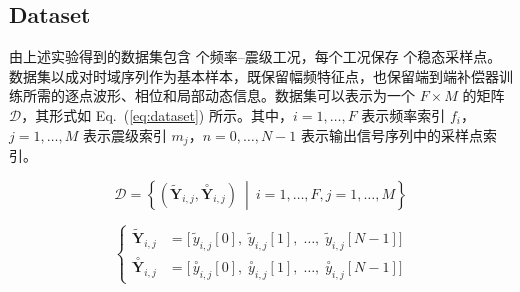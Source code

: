 \documentclass[sn-nature]{sn-jnl}
\newif\ifCNENEnglish
\newif\ifCNENBilingual
\newcommand{\CNEN}[2]{%
    \ifCNENBilingual
        #1%
        \if\relax\detokenize{#2}\relax\else\par #2\fi%
    \else
        \ifCNENEnglish
            #2%
        \else
            #1%
        \fi
    \fi
}
\newcommand{\magn}{m} %
\newcommand{\fidx}{i} %
\newcommand{\fmax}{F} %
\newcommand{\midx}{j} %
\newcommand{\mmax}{M} %
\newcommand{\pidx}{n} %
\newcommand{\pmax}{N} %
\newcommand{\dataset}{{\mathcal{D}}} %
\newcommand{\yseq}{{\mathbf{Y}}} %
\newcommand{\ideal}[1]{\overset{\circ}{#1}} %
\newcommand{\exam}[1]{\tilde{#1}} %
\begin{document}
\subsection{Dataset}
\CNEN{由上述实验得到的数据集包含 \valDatasetOperatingPoints{} 个频率--震级工况，每个工况保存 \valDatasetPointsPerRecord{} 个稳态采样点。数据集以成对时域序列作为基本样本，既保留幅频特征点，也保留端到端补偿器训练所需的逐点波形、相位和局部动态信息。数据集可以表示为一个 $\fmax \times \mmax$ 的矩阵 $\dataset$，其形式如 Eq.~(\ref{eq:dataset}) 所示。其中，$\fidx = 1,\dots,\fmax$ 表示频率索引 $f_\fidx$，$\midx = 1,\dots,\mmax$ 表示震级索引 $\magn_\midx$，$\pidx = 0,\dots,\pmax-1$ 表示输出信号序列中的采样点索引。}{}
\begin{equation}
    \dataset = \left\{ \left(\exam{\yseq}_{\fidx,\midx}, \ideal{\yseq}_{\fidx,\midx} \right) \ \middle| \ \fidx = 1, \dots, \fmax, \midx = 1, \dots, \mmax \right\}
    \label{eq:dataset}
\end{equation}

\begin{equation}
    \left\{
    \begin{aligned}
        \exam{\yseq}_{\fidx,\midx}  & =
        \bigl[
            \,\exam{y}_{\fidx,\midx}[0],\;
            \exam{y}_{\fidx,\midx}[1],\;
            \ldots,\;
            \exam{y}_{\fidx,\midx}[\pmax-1]
        \bigr]                          \\
        \ideal{\yseq}_{\fidx,\midx} & =
        \bigl[
            \,\ideal{y}_{\fidx,\midx}[0],\;
            \ideal{y}_{\fidx,\midx}[1],\;
            \ldots,\;
            \ideal{y}_{\fidx,\midx}[\pmax-1]
            \bigr]
    \end{aligned}
    \right.
    \label{eq:dataset_element}
\end{equation}
\end{document}
